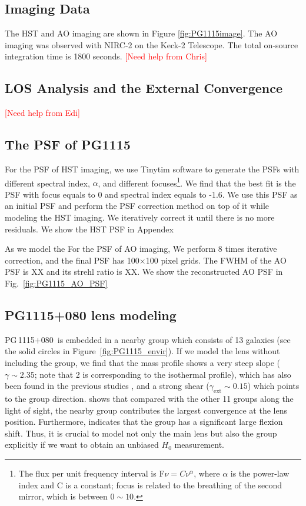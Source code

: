 \documentclass[useAMS,usenatbib]{mnras}
\newcommand\todo[1]{\textcolor{red}{#1}}
\newcommand\pg{PG\,1115$+$080}
\newcommand{\fref}[1]{Figure~\ref{#1}}
\begin{document}
\subsection{Imaging Data}
The HST and AO imaging are shown in Figure \ref{fig:PG1115image}. The AO imaging was observed with NIRC-2 on the Keck-2 Telescope. The total on-source integration time is 1800 seconds.
\todo{[Need help from Chris]}

\subsection{LOS Analysis and the External Convergence}
\todo{[Need help from Edi]}

\subsection{The PSF of PG1115}
For the PSF of HST imaging, we use {\sc Tinytim} software to generate the PSFs with different spectral index, $\alpha$, and different focuses\footnote{The flux per unit frequency interval is F$\nu=C\nu^{\alpha}$, where $\alpha$ is the power-law index and C is a constant; focus is related to the breathing of the second mirror, which is between $0\sim10$.}. We find that the best fit is the PSF with focus equals to 0 and spectral index equals to -1.6. We use this PSF as an initial PSF and perform the PSF correction method on top of it while modeling the HST imaging. We iteratively correct it until there is no more residuals. We show the HST PSF in Appendex

As we model the For the PSF of AO imaging, We perform 8 times iterative correction, and the final PSF has 100$\times$100 pixel grids. The FWHM of the AO PSF is XX and its strehl ratio is XX. We show the reconstructed AO PSF in Fig.~\ref{fig:PG1115_AO_PSF}

\subsection{PG1115+080 lens modeling}
\label{subsubsec:PGmodeling}
\pg~is embedded in a nearby group which consists of 13 galaxies (see the solid circles in \fref{fig:PG1115_envir}). If we model the lens without including the group, we find that the mass profile shows a very steep slope ($\gamma\sim2.35$; note that 2 is corresponding to the isothermal profile), which has also been found in the previous studies \citep[e.g.,][]{TreuKoopmans02}, and a strong shear ($\gamma_{
\textrm{ext}}\sim0.15$) which points to the group direction. \citet{WilsonEtal16} shows that compared with the other 11 groups along the light of sight, the nearby group contributes the largest convergence at the lens position. Furthermore, \cite{McCullyEtal17} indicates that the group has a significant large flexion shift. Thus, it is crucial to model not only the main lens but also the group explicitly if we want to obtain an unbiased $H_{0}$ measurement.
\end{document}

